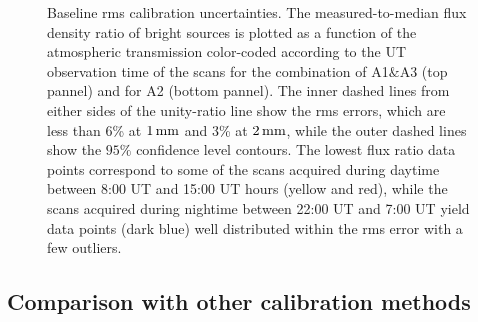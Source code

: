 \begin{figure}[!thbp]
\begin{center}
    \caption[Baseline calibration rms error estimate]{Baseline
      rms calibration uncertainties. The
      measured-to-median flux density ratio of bright sources is
      plotted as a function of the atmospheric transmission
      color-coded according to the UT
      observation time of the scans for the combination of A1$\&$A3
      (top pannel)
      and for A2 (bottom pannel).
      The inner dashed lines from either sides of the
      unity-ratio line show the rms errors, {\lp which
      are less than 6\% at $1\,\rm{mm}$ and 3\% at $2\,\rm{mm}$, while
      the outer dashed lines show the $95\%$ confidence level contours.}
      The lowest flux ratio data points correspond to some of the
      scans acquired during daytime between 8:00 UT and 15:00 UT
      hours (yellow and red), while the scans acquired during nightime
      between 22:00 UT and 7:00 UT yield data points (dark blue)
      well distributed within the rms error with a few outliers.}
    \label{fig:allbright_rms_corrected_skydip}
  \end{center}
\end{figure}




\subsection{Comparison with other calibration methods}
\label{se:photometry_others}


